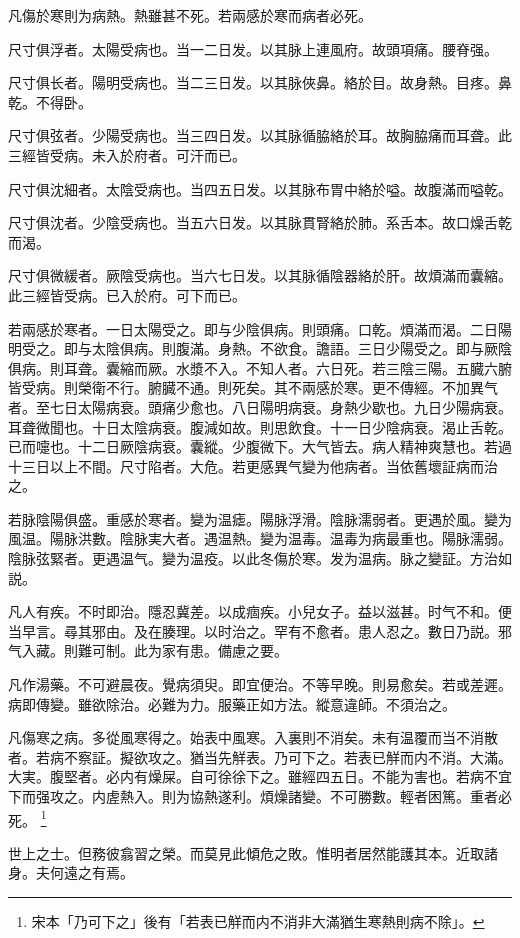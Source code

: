 \documentclass[12pt,twoside,UTF8,b5paper]{ctexbook}
\begin{document}
凡傷於寒則为病熱。熱雖甚不死。若兩感於寒而病者必死。

尺寸俱浮者。太陽受病也。当一二日发。以其脉上連風府。故頭項痛。腰脊强。

尺寸俱长者。陽明受病也。当二三日发。以其脉俠鼻。絡於目。故身熱。目疼。鼻乾。不得卧。

尺寸俱弦者。少陽受病也。当三四日发。以其脉循脇絡於耳。故胸脇痛而耳聋。此三經皆受病。未入於府者。可汗而已。

尺寸俱沈細者。太陰受病也。当四五日发。以其脉布胃中絡於嗌。故腹滿而嗌乾。

尺寸俱沈者。少陰受病也。当五六日发。以其脉貫腎絡於肺。系舌本。故口燥舌乾而渴。

尺寸俱微緩者。厥陰受病也。当六七日发。以其脉循陰器絡於肝。故煩滿而囊縮。此三經皆受病。已入於府。可下而已。

若兩感於寒者。一日太陽受之。即与少陰俱病。則頭痛。口乾。煩滿而渴。二日陽明受之。即与太陰俱病。則腹滿。身熱。不欲食。譫語。三日少陽受之。即与厥陰俱病。則耳聋。囊縮而厥。水漿不入。不知人者。六日死。若三陰三陽。五臓六腑皆受病。則榮衛不行。腑臓不通。則死矣。其不兩感於寒。更不傳經。不加異气者。至七日太陽病衰。頭痛少愈也。八日陽明病衰。身熱少歇也。九日少陽病衰。耳聋微聞也。十日太陰病衰。腹減如故。則思飲食。十一日少陰病衰。渴止舌乾。已而嚏也。十二日厥陰病衰。囊縱。少腹微下。大气皆去。病人精神爽慧也。若過十三日以上不間。尺寸陷者。大危。若更感異气變为他病者。当依舊壞証病而治之。

若脉陰陽俱盛。重感於寒者。變为温瘧。陽脉浮滑。陰脉濡弱者。更遇於風。變为風温。陽脉洪數。陰脉実大者。遇温熱。變为温毒。温毒为病最重也。陽脉濡弱。陰脉弦緊者。更遇温气。變为温疫。以此冬傷於寒。发为温病。脉之變証。方治如説。

凡人有疾。不时即治。隱忍冀差。以成痼疾。小兒女子。益以滋甚。时气不和。便当早言。尋其邪由。及在腠理。以时治之。罕有不愈者。患人忍之。數日乃説。邪气入藏。則難可制。此为家有患。備慮之要。

凡作湯藥。不可避晨夜。覺病須臾。即宜便治。不等早晚。則易愈矣。若或差遲。病即傳變。雖欲除治。必難为力。服藥正如方法。縱意違師。不須治之。

凡傷寒之病。多從風寒得之。始表中風寒。入裏則不消矣。未有温覆而当不消散者。若病不察証。擬欲攻之。猶当先觧表。乃可下之。若表已觧而内不消。大滿。大実。腹堅者。必内有燥屎。自可徐徐下之。雖經四五日。不能为害也。若病不宜下而强攻之。内虗熱入。{則为}協熱遂利。煩燥諸變。不可勝數。輕者困篤。重者必死。
	\footnote{宋本「乃可下之」後有「若表已觧而内不消非大滿猶生寒熱則病不除」。}

世上之士。但務彼翕習之榮。而莫見此傾危之敗。惟明者居然能護其本。近取諸身。夫何遠之有焉。
\end{document}
